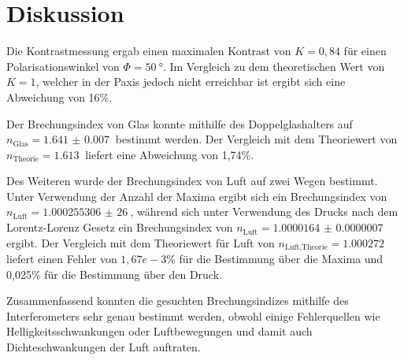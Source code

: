 \section{Diskussion}
\label{sec:Diskussion}
Die Kontrastmessung ergab einen maximalen Kontrast von $K=0,84$ für einen Polarisationswinkel von $\Phi=\SI{50}{\degree}$.
Im Vergleich zu dem theoretischen Wert von $K=1$, welcher in der Paxis jedoch nicht erreichbar ist ergibt sich eine
Abweichung von 16\%.

Der Brechungsindex von Glas konnte mithilfe des Doppelglashalters auf $n_\text{Glas}=\SI{1.641(7)}{}$ bestimmt werden.
Der Vergleich mit dem Theoriewert von $n_\text{Theorie}=\SI{1,613}{}$ liefert eine Abweichung von 1,74\%.

Des Weiteren wurde der Brechungsindex von Luft auf zwei Wegen bestimmt. Unter Verwendung der Anzahl der Maxima ergibt
sich ein Brechungsindex von $n_\text{Luft}=\SI{1,000255306(26)}{}$, während sich unter Verwendung des Drucks nach dem
Lorentz-Lorenz Gesetz ein Brechungsindex von $n_\text{Luft}=\SI{1.0000164(7)}{}$ ergibt.
Der Vergleich mit dem Theoriewert für Luft von $n_\text{Luft,Theorie}=\SI{1,000272}{}$ \cite{ns} liefert einen Fehler von
$1,67e-3$\% für die Bestimmung über die Maxima und 0,025\% für die Bestimmung über den Druck.

Zusammenfassend konnten die gesuchten Brechungsindizes mithilfe des Interferometers sehr genau bestimmt werden, obwohl
einige Fehlerquellen wie Helligkeitsschwankungen oder Luftbewegungen und damit auch Dichteschwankungen der Luft auftraten.
